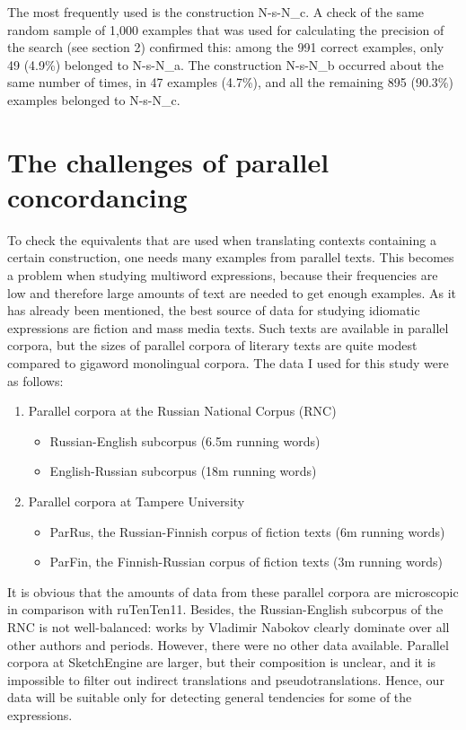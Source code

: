 \documentclass[output=paper]{langscibook}
\begin{document}
The most frequently used is the construction N-s-N\_c. A check of the same random sample of 1,000 examples that was used for calculating the precision of the search (see section 2) confirmed this: among the 991 correct examples, only 49 (4.9\%) belonged to N-s-N\_a. The construction N-s-N\_b occurred about the same number of times, in 47 examples (4.7\%), and all the remaining 895 (90.3\%) examples belonged to N-s-N\_c.

\section{The challenges of parallel concordancing}

To check the equivalents that are used when translating contexts containing a certain construction, one needs many examples from parallel texts. This becomes a problem when studying multiword expressions, because their frequencies are low and therefore large amounts of text are needed to get enough examples. As it has already been mentioned, the best source of data for studying idiomatic expressions are fiction and mass media texts. Such texts are available in parallel corpora, but the sizes of parallel corpora of literary texts are quite modest compared to gigaword monolingual corpora. The data I used for this study were as follows:

\begin{enumerate}
\item  Parallel corpora at the Russian National Corpus (RNC)
\begin{itemize}
\item Russian-English subcorpus (6.5m running words)
\item English-Russian subcorpus (18m running words)
\end{itemize}
\item Parallel corpora at Tampere University
\begin{itemize}\sloppy
\item ParRus, the Russian-Finnish corpus of fiction texts (6m running words)
\item ParFin, the Finnish-Russian corpus of fiction texts (3m running words)
\end{itemize}
\end{enumerate}

It is obvious that the amounts of data from these parallel corpora are microscopic in comparison with ruTenTen11. Besides, the Russian-English subcorpus of the RNC is not well-balanced: works by Vladimir Nabokov clearly dominate over all other authors and periods. However, there were no other data available. Parallel corpora at SketchEngine are larger, but their composition is unclear, and it is impossible to filter out indirect translations and pseudotranslations. Hence, our data will be suitable only for detecting general tendencies for some of the expressions.
\end{document}
